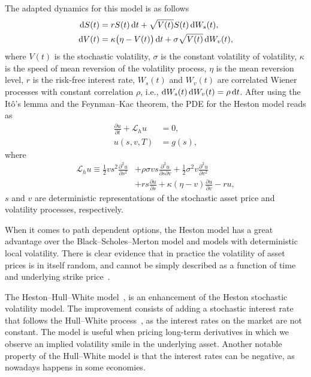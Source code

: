 \documentclass{UUThesisTemplate}
\begin{document}
\par
The adapted dynamics for this model is as follows
\begin{align}
\dif S(t) & =  rS(t)\dif t + \sqrt{V(t)} S(t) \dif W_s(t), \label{qlsvSDE1} \\
\dif V(t) & =  \kappa\big(\eta-V(t)\big)\dif t + \sigma \sqrt{V(t)}\dif W_v(t), \label{qlsvSDE2}
\end{align}
where $V(t)$ is the stochastic volatility, $\sigma$ is the constant volatility of volatility, $\kappa$ is the speed of mean reversion of the volatility process, $\eta$ is the mean reversion level, $r$ is the risk-free interest rate, $W_s(t)$ and $W_v(t)$ are correlated Wiener processes with constant correlation $\rho$, i.e., $\dif W_s(t) \dif W_v(t) = \rho \dif t$. After using the It\^{o}'s lemma and the Feynman--Kac theorem, the PDE for the Heston model reads as
\begin{align}
\frac{\partial u}{\partial t}+\mathcal{L}_h u&=0, \nonumber \\
u(s,v,T) &= g(s), \label{hstPDE}
\end{align}
where
\begin{align}
\mathcal{L}_{h} u \equiv \frac{1}{2}vs^2\frac{\partial^2 u}{\partial s^2} &+ \rho\sigma v s \frac{\partial^2 u}{\partial s\partial v} + \frac{1}{2}\sigma^2v\frac{\partial^2 u}{\partial v^2} \nonumber \\ 
               &+ rs\frac{\partial u}{\partial s} + \kappa(\eta-v)\frac{\partial u}{\partial v} - ru, \label{eqHSTop}
\end{align}
$s$ and $v$ are deterministic representations of the stochastic asset price and volatility processes, respectively.
\par
When it comes to path dependent options, the Heston model has a great advantage over the Black--Scholes--Merton model and models with deterministic local volatility. There is clear evidence that in practice the volatility of asset prices is in itself random, and cannot be simply described as a function of time and underlying strike price~\cite{cont2001empirical}. 

\par
The Heston--Hull--White model~\cite{grzelak2011heston, grzelak2012extension}, is an enhancement of the Heston stochastic volatility model. The improvement consists of adding a stochastic interest rate that follows the Hull--White process~\cite{hull1990pricing}, as the interest rates on the market are not constant. The model is useful when pricing long-term derivatives in which we observe an implied volatility smile in the underlying asset. Another notable property of the Hull--White model is that the interest rates can be negative, as nowadays happens in some economies. 
\end{document}
